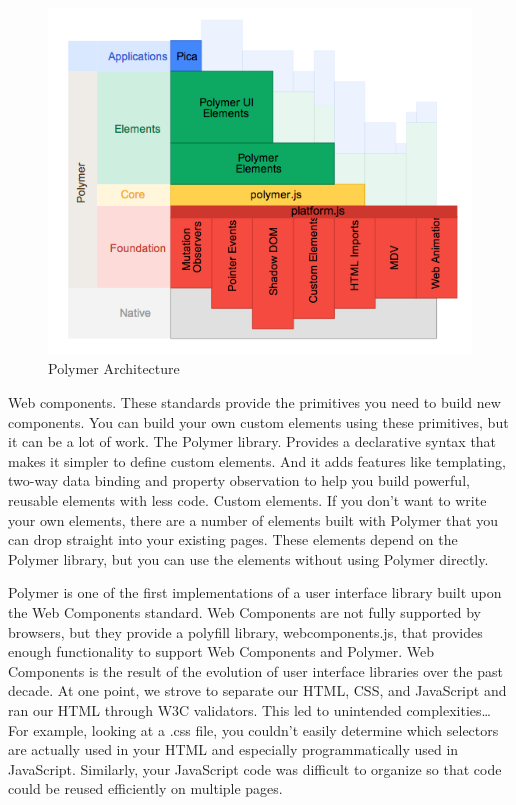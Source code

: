 \begin {figure}[h]
\graphicspath{{images/chapter_TCH/}}
\includegraphics[width=\textwidth]{polymer_1}
\caption{Polymer Architecture}
\end {figure}
 

Web components. These standards provide the primitives you need to build new components. You can build your own custom elements using these primitives, but it can be a lot of work.
The Polymer library. Provides a declarative syntax that makes it simpler to define custom elements. And it adds features like templating, two-way data binding and property observation to help you build powerful, reusable elements with less code.
Custom elements. If you don’t want to write your own elements, there are a number of elements built with Polymer that you can drop straight into your existing pages. These elements depend on the Polymer library, but you can use the elements without using Polymer directly.\cite{tch_polymer1}


Polymer is one of the first implementations of a user interface library built upon the Web Components standard.  Web Components are not fully supported by browsers, but they provide a polyfill library, webcomponents.js, that provides enough functionality to support Web Components and Polymer.
Web Components is the result of the evolution of user interface libraries over the past decade.  At one point, we strove to separate our HTML, CSS, and JavaScript and ran our HTML through W3C validators. This led to unintended complexities…  For example, looking at a .css file, you couldn’t easily determine which selectors are actually used in your HTML and especially programmatically used in JavaScript.  Similarly, your JavaScript code was difficult to organize so that code could be reused efficiently on multiple pages.\cite{tch_polymer2}
